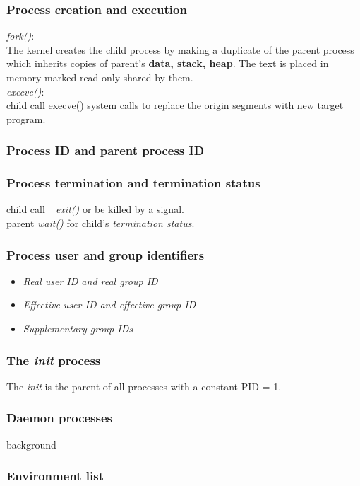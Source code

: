 \documentclass{article}
\begin{document}
\subsubsection*{Process creation and execution}
\textit{fork()}:\\
The kernel creates the child process by making a duplicate of the parent process which inherits copies of parent's \textbf{data, stack, heap}. The text is placed in memory marked read-only shared by them.\\
\textit{execve()}:\\
child call execve() system calls to replace the origin segments with new target program.

\subsubsection*{Process ID and parent process ID}
\subsubsection*{Process termination and termination status}
child call \textit{\_exit()} or be killed by a signal.\\
parent \textit{wait()} for child's \textit{termination status}.
\subsubsection*{Process user and group identifiers}
\begin{itemize}
\item \textit{Real user ID and real group ID}
\item \textit{Effective user ID and effective group ID}
\item \textit{Supplementary group IDs}
\end{itemize}

\subsubsection*{The \textit{init} process}
The \textit{init} is the parent of all processes with a constant PID = 1.\\

\subsubsection*{Daemon processes}
background
\subsubsection*{Environment list}
\end{document}
